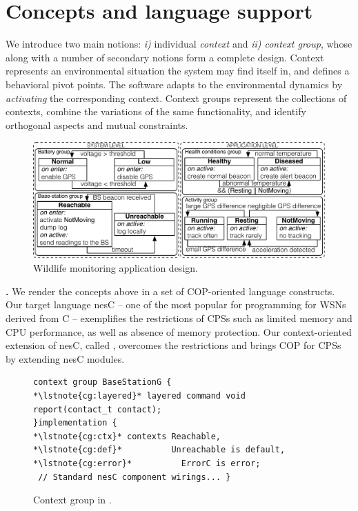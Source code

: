\section{Concepts and language support}\label{sec:concepts}

We introduce two main notions: \emph{i)} individual \emph{context} and \emph{ii)
context group}, whose along with a number of secondary notions form a complete
design. Context represents an environmental situation the system may find itself
in, and defines a behavioral pivot points. The software adapts to the environmental
dynamics by \emph{activating} the corresponding context. Context groups
represent the collections of contexts, combine the variations of the same
functionality, and identify orthogonal aspects and mutual constraints.

\begin{figure}
\begin{center}
\includegraphics[scale=.45]{imgs/wildlifetracking}
\vspace{-1mm}
\caption{Wildlife monitoring application design.}
  \label{fig:design}
\vspace{-7mm}
\end{center}
\end{figure}

{\bf \conesc.} We render the concepts above in a set of COP-oriented language
constructs. Our target language nesC -- one of the most popular for programming
for WSNs derived from C -- exemplifies the restrictions of CPSs such as limited
memory and CPU performance, as well as absence of memory protection. Our
context-oriented extension of nesC, called \conesc, overcomes the restrictions
and brings COP for CPSs by extending nesC modules.

\begin{figure}[!tb]
\begin{lstlisting}[style=conescframe]
context group BaseStationG {
*\lstnote{cg:layered}* layered command void report(contact_t contact);
}implementation {
*\lstnote{cg:ctx}* contexts Reachable, 
*\lstnote{cg:def}*          Unreachable is default,
*\lstnote{cg:error}*          ErrorC is error;
 // Standard nesC component wirings... }
\end{lstlisting}
\vspace{-3mm}
\caption{Context group in \conesc.}
  \label{fig:configuration}
\vspace{-7mm}
\end{figure}

